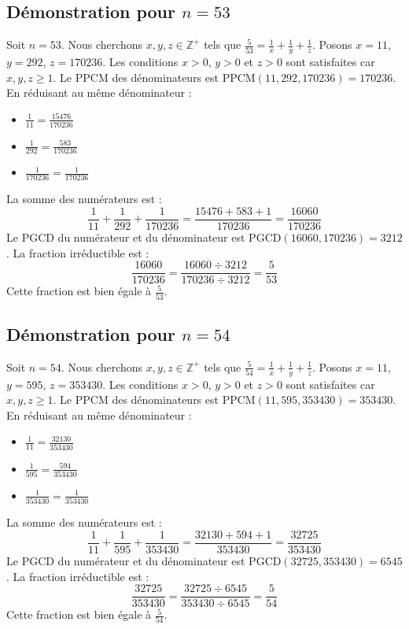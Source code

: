 \documentclass[11pt,a4paper]{article}
\begin{document}
\subsection{Démonstration pour $n = 53$}
Soit $n = 53$. Nous cherchons $x, y, z \in \mathbb{Z}^{+}$ tels que $\frac{5}{53} = \frac{1}{x} + \frac{1}{y} + \frac{1}{z}$.
Posons $x = 11$, $y = 292$, $z = 170236$.
Les conditions $x > 0$, $y > 0$ et $z > 0$ sont satisfaites car $x, y, z \geq 1$.
Le PPCM des dénominateurs est $\text{PPCM}(11, 292, 170236) = 170236$.
En réduisant au même dénominateur :
\begin{itemize}
    \item $\frac{1}{11} = \frac{15476}{170236}$
    \item $\frac{1}{292} = \frac{583}{170236}$
    \item $\frac{1}{170236} = \frac{1}{170236}$
\end{itemize}
La somme des numérateurs est :
$$ \frac{1}{11} + \frac{1}{292} + \frac{1}{170236} = \frac{15476 + 583 + 1}{170236} = \frac{16060}{170236} $$
Le PGCD du numérateur et du dénominateur est $\text{PGCD}(16060, 170236) = 3212$.
La fraction irréductible est :
$$ \frac{16060}{170236} = \frac{16060 \div 3212}{170236 \div 3212} = \frac{5}{53} $$
Cette fraction est bien égale à $\frac{5}{53}$.

\subsection{Démonstration pour $n = 54$}
Soit $n = 54$. Nous cherchons $x, y, z \in \mathbb{Z}^{+}$ tels que $\frac{5}{54} = \frac{1}{x} + \frac{1}{y} + \frac{1}{z}$.
Posons $x = 11$, $y = 595$, $z = 353430$.
Les conditions $x > 0$, $y > 0$ et $z > 0$ sont satisfaites car $x, y, z \geq 1$.
Le PPCM des dénominateurs est $\text{PPCM}(11, 595, 353430) = 353430$.
En réduisant au même dénominateur :
\begin{itemize}
    \item $\frac{1}{11} = \frac{32130}{353430}$
    \item $\frac{1}{595} = \frac{594}{353430}$
    \item $\frac{1}{353430} = \frac{1}{353430}$
\end{itemize}
La somme des numérateurs est :
$$ \frac{1}{11} + \frac{1}{595} + \frac{1}{353430} = \frac{32130 + 594 + 1}{353430} = \frac{32725}{353430} $$
Le PGCD du numérateur et du dénominateur est $\text{PGCD}(32725, 353430) = 6545$.
La fraction irréductible est :
$$ \frac{32725}{353430} = \frac{32725 \div 6545}{353430 \div 6545} = \frac{5}{54} $$
Cette fraction est bien égale à $\frac{5}{54}$.
\end{document}
